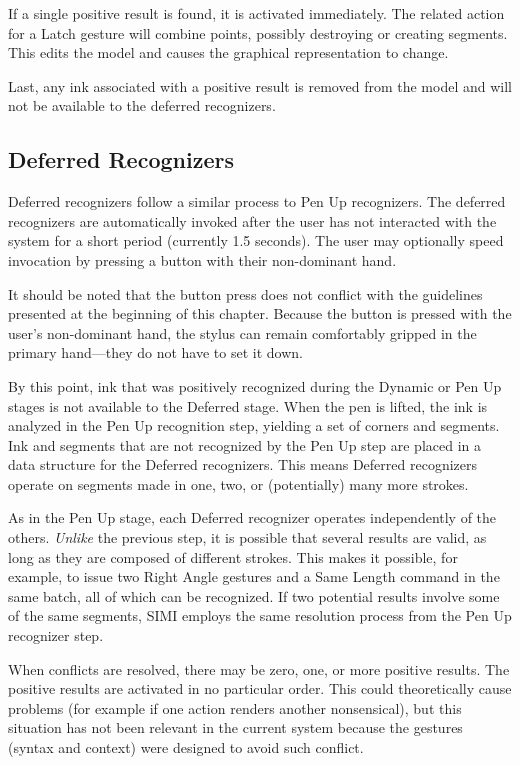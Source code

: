 If a single positive result is found, it is activated immediately. The
related action for a Latch gesture will combine points, possibly
destroying or creating segments. This edits the model and causes the
graphical representation to change.

Last, any ink associated with a positive result is removed from the
model and will not be available to the deferred recognizers.

\subsection{Deferred Recognizers}

Deferred recognizers follow a similar process to Pen Up
recognizers. The deferred recognizers are automatically invoked after
the user has not interacted with the system for a short period
(currently 1.5 seconds). The user may optionally speed invocation by
pressing a button with their non-dominant hand.

It should be noted that the button press does not conflict with the
guidelines presented at the beginning of this chapter. Because the
button is pressed with the user's non-dominant hand, the stylus can
remain comfortably gripped in the primary hand---they do not have to
set it down.

By this point, ink that was positively recognized during the Dynamic
or Pen Up stages is not available to the Deferred stage. When the pen
is lifted, the ink is analyzed in the Pen Up recognition step,
yielding a set of corners and segments. Ink and segments that are not
recognized by the Pen Up step are placed in a data structure for the
Deferred recognizers. This means Deferred recognizers operate on
segments made in one, two, or (potentially) many more strokes.

As in the Pen Up stage, each Deferred recognizer operates
independently of the others. \textit{Unlike} the previous step, it is
possible that several results are valid, as long as they are composed
of different strokes. This makes it possible, for example, to issue
two Right Angle gestures and a Same Length command in the same batch,
all of which can be recognized. If two potential results involve some
of the same segments, SIMI employs the same resolution process from
the Pen Up recognizer step.

When conflicts are resolved, there may be zero, one, or more positive
results. The positive results are activated in no particular
order. This could theoretically cause problems (for example if one
action renders another nonsensical), but this situation has not been
relevant in the current system because the gestures (syntax and
context) were designed to avoid such conflict.

